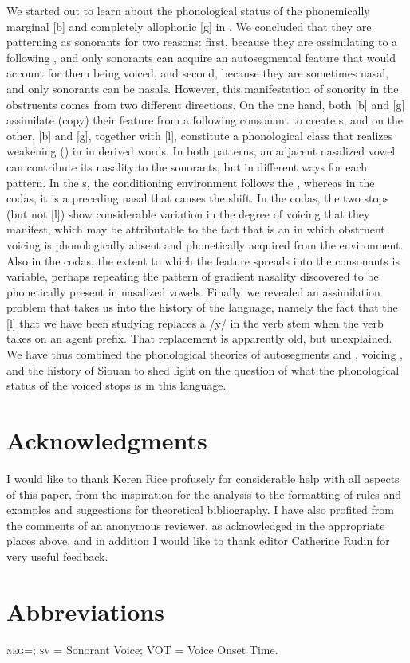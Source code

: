 \documentclass[output=paper]{LSP/langsci}
\begin{document}
We started out to learn about the phonological status of the phonemically marginal [b] and completely allophonic [g] in . We concluded that they are patterning as sonorants for two reasons: first, because they are assimilating to a following , and only sonorants can acquire an autosegmental feature that would account for them being voiced, and second, because they are sometimes nasal, and only sonorants can be nasals. However, this manifestation of sonority in the obstruents comes from two different directions. On the one hand, both [b] and [g] assimilate (copy) their  feature from a following consonant to create s, and on the other, [b] and [g], together with [l], constitute a phonological class that realizes weakening () in  in derived words. In both patterns, an adjacent nasalized vowel can contribute its nasality to the sonorants, but in different ways for each pattern. In the s, the conditioning environment follows the , whereas in the codas, it is a preceding nasal that causes the shift. In the codas, the two stops (but not [l]) show considerable variation in the degree of voicing that they manifest, which may be attributable to the fact that  is an  in which obstruent voicing is phonologically absent and phonetically acquired from the environment. Also in the codas, the extent to which the  feature spreads into the consonants is variable, perhaps repeating the pattern of gradient nasality discovered to be phonetically present in nasalized vowels. Finally, we revealed an assimilation problem that takes us into the history of the language, namely the fact that the [l] that we have been studying replaces a /y/ in the verb stem when the verb takes on an agent prefix. That replacement is apparently old, but unexplained.
We have thus combined the phonological theories of autosegments and , voicing , and the history of Siouan to shed light on the question of what the phonological status of the voiced stops is in this language.

\section*{Acknowledgments}

I would like to thank Keren Rice profusely for considerable help with all aspects of this paper, from the inspiration for the analysis to the formatting of rules and examples and suggestions for theoretical bibliography. I have also profited from the comments of an anonymous reviewer, as acknowledged in the appropriate places above, and in addition I would like to thank editor Catherine Rudin for very useful feedback.

\section*{Abbreviations}
\textsc{neg}=; \textsc{sv} = Sonorant Voice; VOT = Voice Onset Time.

\printbibliography[heading=subbibliography,notkeyword=this]
 
\end{document}

